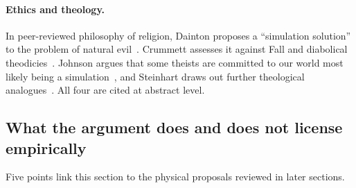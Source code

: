 \paragraph{Ethics and theology.}
In peer-reviewed philosophy of religion, Dainton proposes a ``simulation solution'' to the
problem of natural evil~\cite{Dainton2020natural}. Crummett assesses it against Fall and
diabolical theodicies~\cite{Crummett2021real}. Johnson argues that some theists are
committed to our world most likely being a simulation~\cite{Johnson2011natural}, and
Steinhart draws out further theological analogues~\cite{Steinhart2010theological}. All four
are cited at abstract level.

\subsection{What the argument does and does not license empirically}
\label{sec:philosophy:bridge}

Five points link this section to the physical proposals reviewed in later sections.

